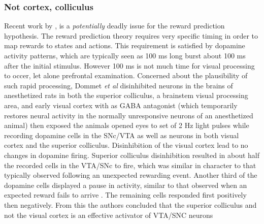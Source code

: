 \documentclass[doc,12pt]{apa}        %
\begin{document}
\subsubsection{Not cortex, colliculus}
\label{subsub:colliculus}
Recent work by , is a \emph{potentially} deadly issue for the reward prediction hypothesis.  The reward prediction theory requires very specific timing in order to map rewards to states and actions.  This requirement is satisfied by dopamine activity patterns, which are typically seen as 100 ms long burst about 100 ms after the initial stimulus.  However 100 ms is not much time for visual processing to occer, let alone prefrontal examination.  Concerned about the plausibility of such rapid processing, Dommet \emph{et al} disinhibited neurons in the brains of anesthetized rats in both the superior colliculus, a brainstem visual processing area, and early visual cortex with as GABA antagonist (which temporarily restores neural activity in the normally unresponsive neurons of an anesthetized animal) then exposed the animals opened eyes to set of 2 Hz light pulses while recording dopamine cells in the SNc/VTA as well as neurons in both visual cortex and the superior colliculus.  Disinhibition of the visual cortex lead to no changes in dopamine firing.  Superior colliculus disinhibition resulted in about half the recorded cells in the VTA/SNc to fire, which was similar in character to that typically observed following an unexpected rewarding event.  Another third of the dopamine cells displayed a pause in activity, similar to that observed when an expected reward fails to arrive \cite{Mirenowicz:1994p7185}.  The remaining cells responded first positively then negatively.  From this the authors concluded that the superior colliculus and not the visual cortex is an effective activator of VTA/SNC neurons
\end{document}
